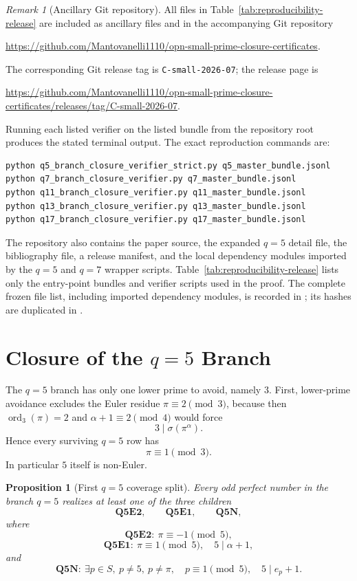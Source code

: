 \documentclass[11pt]{article}
\newtheorem{proposition}[theorem]{Proposition}
\theoremstyle{definition}
\theoremstyle{remark}
\newtheorem{remark}[theorem]{Remark}
\DeclareMathOperator{\ord}{ord}
\begin{document}
\begin{remark}[Ancillary Git repository]
All files in Table~\ref{tab:reproducibility-release} are included as ancillary
files and in the accompanying Git repository
\begin{center}
  \url{https://github.com/Mantovanelli1110/opn-small-prime-closure-certificates}.
\end{center}
The corresponding Git release tag is \texttt{C-small-2026-07}; the release
page is
\begin{center}
  \url{https://github.com/Mantovanelli1110/opn-small-prime-closure-certificates/releases/tag/C-small-2026-07}.
\end{center}
Running each listed verifier on the listed bundle from the repository root
produces the stated terminal output.  The exact reproduction commands are:
\begin{verbatim}
python q5_branch_closure_verifier_strict.py q5_master_bundle.jsonl
python q7_branch_closure_verifier.py q7_master_bundle.jsonl
python q11_branch_closure_verifier.py q11_master_bundle.jsonl
python q13_branch_closure_verifier.py q13_master_bundle.jsonl
python q17_branch_closure_verifier.py q17_master_bundle.jsonl
\end{verbatim}
The repository also contains the paper source, the expanded \(q=5\) detail
file, the bibliography file, a release manifest, and the local dependency
modules imported by the \(q=5\) and \(q=7\) wrapper scripts.
Table~\ref{tab:reproducibility-release} lists only the entry-point bundles and
verifier scripts used in the proof.  The complete frozen file list, including
imported dependency modules, is recorded in ; its
hashes are duplicated in .
\end{remark}

\section{Closure of the \(q=5\) Branch}
\label{sec:q5}

The \(q=5\) branch has only one lower prime to avoid, namely \(3\).  First,
lower-prime avoidance excludes the Euler residue \(\pi\equiv2\pmod3\), because
then \(\ord_3(\pi)=2\) and \(\alpha+1\equiv2\pmod4\) would force
\[
  3\mid\sigma(\pi^\alpha).
\]
Hence every surviving \(q=5\) row has
\[
  \pi\equiv1\pmod3.
\]
In particular \(5\) itself is non-Euler.

\begin{proposition}[First \(q=5\) coverage split]
\label{prop:q5-coverage}
Every odd perfect number in the branch \(q=5\) realizes at least one of the
three children
\[
  \mathbf{Q5E2},\qquad \mathbf{Q5E1},\qquad \mathbf{Q5N},
\]
where
\[
  \mathbf{Q5E2}:\ \pi\equiv-1\pmod5,
\]
\[
  \mathbf{Q5E1}:\ \pi\equiv1\pmod5,\quad 5\mid\alpha+1,
\]
and
\[
  \mathbf{Q5N}:\ \exists p\in S,\ p\ne5,\ p\ne\pi,\quad
  p\equiv1\pmod5,\quad 5\mid e_p+1.
\]
\end{proposition}
\end{document}
